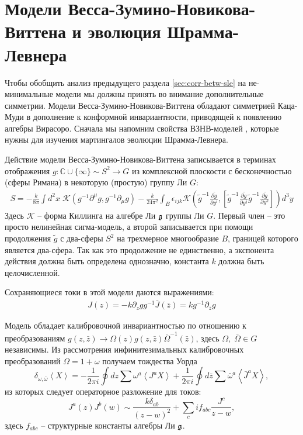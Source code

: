 \section{Модели Весса-Зумино-Новикова-Виттена и эволюция Шрамма-Левнера}
\label{sec:sle-wzw-models}
Чтобы обобщить анализ предыдущего раздела  \ref{sec:corr-betw-sle} на не-минимальные модели мы должны принять во внимание дополнительные симметрии. Модели Весса-Зумино-Новикова-Виттена обладают симметрией Каца-Муди в дополнение к конформной инвариантности, приводящей к появлению алгебры Вирасоро. Сначала мы напомним свойства ВЗНВ-моделей \cite{difrancesco1997cft}, которые нужны для изучения мартингалов эволюции Шрамма-Левнера.

Действие модели Весса-Зумино-Новикова-Виттена записывается в терминах отображения $g:\mathbb{C}\cup \{\infty\}\sim S^{2}\to G$ из комплексной плоскости с бесконечностью (сферы Римана) в некоторую (простую) группу Ли $G$:
\begin{multline}
  S=-\frac{k}{8\pi}\int d^2x\; \mathcal{K} (g^{-1}\partial^{\mu}g, g^{-1} \partial_{\mu}g)  
  - \frac{k }{24\pi^{2}} \int_{B}\epsilon_{ijk} \mathcal{K}\left(
    \tilde g^{-1}\frac{\partial \tilde g}{\partial y^i},\left[
      \tilde g^{-1}\frac{\partial \tilde g}{\partial y^j}
      \tilde g^{-1}\frac{\partial \tilde g}{\partial y^k}\right]\right) d^3y
\end{multline}
Здесь $\mathcal{K}$ -- форма Киллинга на алгебре Ли  $\mathfrak{g}$ группы Ли $G$. Первый член -- это просто нелинейная сигма-модель, а второй записывается при помощи продолжения $\tilde{g}$ с два-сферы $S^{2}$ на трехмерное многообразие $B$, границей которого является два-сфера. Так как это продолжение не единственно, а экспонента действия должна быть определена однозначно, константа  $k$ должна быть целочисленной.

Сохраняющиеся токи в этой модели даются выражениями:
  \begin{eqnarray}
    J(z)= -k \partial_zg g^{-1}
    \bar J(\bar z)=k g^{-1}\partial_{\bar z}g
  \end{eqnarray}

Модель обладает калибровочной инвариантностью по отношению к преобразованиям
  $g(z,\bar z)\to \Omega(z)g(z,\bar z)\bar \Omega^{-1}(\bar z)$, 
здесь $\Omega,\;\bar \Omega \in G$ независимы. Из рассмотрения инфинитезимальных калибровочных преобразований  $\Omega=1+\omega$ получаем тождества Уорда
  \begin{equation}
    \label{eq:87}
    \delta_{\omega,\bar \omega}\left< X \right>=-\frac{1}{2\pi i}\oint dz \sum\omega^a \left< J^a X\right>+
    \frac{1}{2\pi i} \oint d\bar z \sum \bar \omega^a \left< \bar J^a X\right>,
  \end{equation}
из которых следует операторное разложение для токов:
 \begin{equation}
   \label{eq:3}
   J^{a}(z)J^{b}(w)\sim \frac{k\delta_{ab}}{(z-w)^{2}}+\sum_{c}i f_{abc}\frac{J^{c}}{z-w},
 \end{equation}
здесь $f_{abc}$ -- структурные константы алгебры Ли $\mathfrak{g}$.
 
